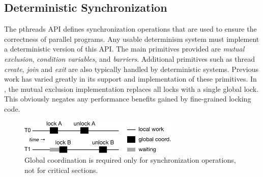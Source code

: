 


\subsection{Deterministic Synchronization}
\label{s:detsync}

The pthreads API defines synchronization operations that are used to ensure the correctness of parallel programs. Any usable determinism system must implement a deterministic version of this API. The main primitives provided are \emph{mutual exclusion}, \emph{condition variables}, and \emph{barriers}. Additional primitives such as thread \emph{create}, \emph{join} and \emph{exit} are also typically handled by deterministic systems. Previous work has varied greatly in its support and implementation of these primitives. In \cite{liu_dthreads:_2011}, the mutual exclusion implementation replaces all locks with a single global lock. This obviously negates any performance benefits gained by fine-grained locking code.

\begin{figure}
\centering
\includegraphics[width=3in]{figures/local-global}
\caption{Global coordination is required only for synchronization operations, not for critical sections.}
\label{f:local-global}
\end{figure}

